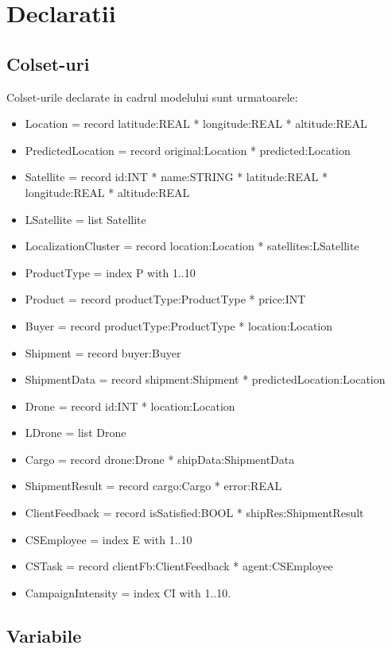 
\chapter{Declaratii} 
\begin{spacing}{1.5}
\setlength{\parskip}{0.3in}

\section{Colset-uri}

Colset-urile declarate in cadrul modelului sunt urmatoarele:
\begin{itemize}
\item Location = record latitude:REAL * longitude:REAL * altitude:REAL
\item PredictedLocation = record original:Location * predicted:Location
\item Satellite = record id:INT * name:STRING * latitude:REAL * longitude:REAL * altitude:REAL
\item LSatellite = list Satellite
\item LocalizationCluster = record location:Location * satellites:LSatellite
\item ProductType = index P with 1..10
\item Product = record productType:ProductType * price:INT
\item Buyer = record productType:ProductType * location:Location
\item Shipment = record buyer:Buyer
\item ShipmentData = record shipment:Shipment * predictedLocation:Location
\item Drone = record id:INT * location:Location
\item LDrone = list Drone
\item Cargo = record drone:Drone * shipData:ShipmentData
\item ShipmentResult = record cargo:Cargo * error:REAL
\item ClientFeedback = record isSatisfied:BOOL * shipRes:ShipmentResult
\item CSEmployee = index E with 1..10
\item CSTask = record clientFb:ClientFeedback * agent:CSEmployee
\item CampaignIntensity = index CI with 1..10.
\end{itemize}

\section{Variabile}


\end{spacing}
